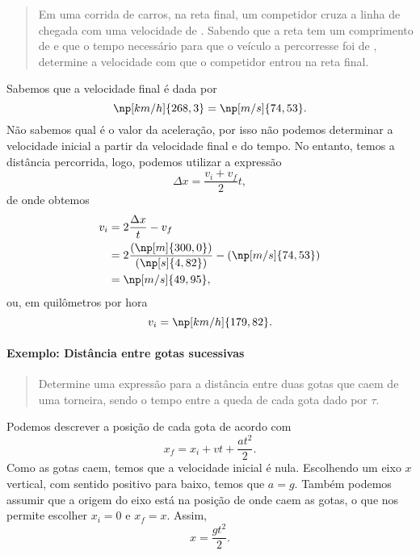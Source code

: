 \begin{quote}
    Em uma corrida de carros, na reta final, um competidor cruza a linha de chegada com uma velocidade de . Sabendo que a reta tem um comprimento de  e que o tempo necessário para que o veículo a percorresse foi de , determine a velocidade com que o competidor entrou na reta final.
\end{quote}

Sabemos que a velocidade final é dada por
\begin{equation*}
    \np[km/h]{268,3} = \np[m/s]{74,53}.
\end{equation*}
%
Não sabemos qual é o valor da aceleração, por isso não podemos determinar a velocidade inicial a partir da velocidade final e do tempo. No entanto, temos a distância percorrida, logo, podemos utilizar a expressão
\begin{equation}
    \Delta x = \frac{v_i + v_f}{2} t,
\end{equation}
%
de onde obtemos
\begin{align}
    v_i &= 2\frac{\Delta x}{t} - v_f \\
    &= 2 \frac{(\np[m]{300,0})}{(\np[s]{4,82})} - (\np[m/s]{74,53}) \\
    &= \np[m/s]{49,95},
\end{align}
%
ou, em quilômetros por hora
\begin{equation}
    v_i = \np[km/h]{179,82}.
\end{equation}

\paragraph{Exemplo: Distância entre gotas sucessivas}

\begin{quote}
	Determine uma expressão para a distância entre duas gotas que caem de uma torneira, sendo o tempo entre a queda de cada gota dado por $\tau$.
\end{quote}

Podemos descrever a posição de cada gota de acordo com
\begin{equation}
	x_f = x_i + vt + \frac{at^2}{2}.
\end{equation}
%
Como as gotas caem, temos que a velocidade inicial é nula. Escolhendo um eixo $x$ vertical, com sentido positivo para baixo, temos que $a = g$. Também podemos assumir que a origem do eixo está na posição de onde caem as gotas, o que nos permite escolher $x_i = 0$ e $x_f = x$. Assim,
\begin{equation}
	x = \frac{gt^2}{2}.
\end{equation}

